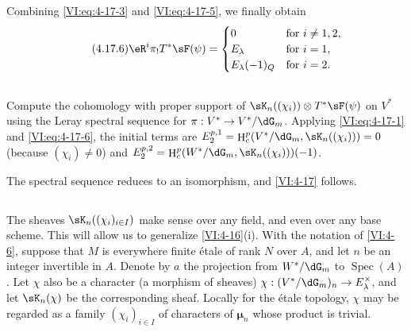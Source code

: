 \documentclass[12pt,oneside,english]{smfbook}
\DeclareMathOperator{\h}{H}
\DeclareMathOperator{\spec}{Spec}
\newcommand{\dmu}{{\bm\mu}}
\newcounter{char}
\begin{document}
Combining \eqref{VI:eq:4-17-3} and \eqref{VI:eq:4-17-5}, we finally obtain
\begin{equation*}\tag{4.17.6}\label{VI:eq:4-17-6}
  \eR^i \pi_! T^\ast\sF(\psi) =
    \begin{cases}
      0 & \text{for $i\ne 1,2$}, \\
      E_\lambda & \text{for $i=1$}, \\
      E_\lambda(-1)_Q & \text{for $i=2$.}
    \end{cases}
\end{equation*}

\subsection{}\label{VI:4-18}

Compute the cohomology with proper support of $\sK_n((\chi_i))\otimes T^\ast\sF(\psi)$ on $V^\ast$ using the Leray spectral sequence for $\pi:V^\ast\to V^\ast/\dG_m$. Applying \eqref{VI:eq:4-17-1} and \eqref{VI:eq:4-17-6}, the initial terms are $E_2^{p,1}=\h_c^p(V^\ast/\dG_m,\sK_n((\chi_i)))=0$ (because $(\chi_i)\ne0$) and $E_2^{p,2}=\h_c^p(W^\ast/\dG_m,\sK_n((\chi_i)))(-1)$.

The spectral sequence reduces to an isomorphism, and \ref{VI:4-17} follows.

\subsection{}\label{VI:4-19}

The sheaves $\sK_n((\chi_i)_{i\in I})$ make sense over any field, and even over any base scheme. This will allow us to generalize \ref{VI:4-16}(i). With the notation of \ref{VI:4-6}, suppose that $M$ is everywhere finite étale of rank $N$ over $A$, and let $n$ be an integer invertible in $A$. Denote by $a$ the projection from $W^\ast/\dG_m$ to $\spec(A)$. Let $\chi$ also be a character (a morphism of sheaves) $\chi:(V^\ast/\dG_m)_n\to E_\lambda^\times$, and let $\sK_n(\chi)$ be the corresponding sheaf. Locally for the étale topology, $\chi$ may be regarded as a family $(\chi_i)_{i\in I}$ of characters of $\dmu_n$ whose product is trivial.
\end{document}
